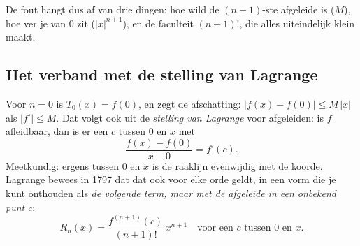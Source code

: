 De fout hangt dus af van drie dingen: hoe wild de $(n+1)$-ste afgeleide is ($M$), hoe ver je van 0 zit ($|x|^{n+1}$), en de faculteit $(n+1)!$, die alles uiteindelijk klein maakt.

\subsection{Het verband met de stelling van Lagrange}

Voor $n = 0$ is $T_0(x) = f(0)$, en zegt de afschatting: $|f(x) - f(0)| \leqslant M\,|x|$ als $|f'| \leqslant M$. Dat volgt ook uit de \textit{stelling van Lagrange} voor afgeleiden: is $f$ afleidbaar, dan is er een $c$ tussen 0 en $x$ met
\[ \frac{f(x) - f(0)}{x - 0} = f'(c) . \]
Meetkundig: ergens tussen 0 en $x$ is de raaklijn evenwijdig met de koorde. Lagrange bewees in 1797 dat dat ook voor elke orde geldt, in een vorm die je kunt onthouden als \textit{de volgende term, maar met de afgeleide in een onbekend punt $c$}:
\[ R_n(x) = \frac{f^{(n+1)}(c)}{(n+1)!}\,x^{n+1} \quad\text{voor een } c \text{ tussen } 0 \text{ en } x . \]


